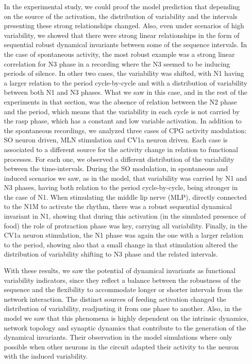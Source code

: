 In the experimental study, we could proof the model prediction that depending on the source of the activation, the distribution of variability and the intervals presenting these strong relationships changed. Also, even under scenarios of high variability, we showed that there were strong linear relationships in the form of sequential robust dynamical invariants between some of the sequence intervals. In the case of spontaneous activity, the most robust example was a strong linear correlation for N3 phase in a recording where the N3 seemed to be inducing periods of silence. In other two cases, the variability was shifted, with N1 having a larger relation to the period cycle-by-cycle and with a distribution of variability between both N1 and N3 phases. What we saw in this case, and in the rest of the experiments in that section, was the absence of relation between the N2 phase and the period, which means that the variability in each cycle is not carried by the rasp phase, which has a constant and low variable activation. In addition to the spontaneous recordings, we analyzed three cases of CPG activity modulation: SO neuron driven, MLN stimulation and CV1a neuron driven. Each case is associated to a different source for the activity change in relation to functional processes. For each one, we observed a different distribution of the variability between the time-intervals. During the SO modulation, in spontaneous and induced scenarios we saw, as in the model, that variability was carried by N1 and N3 phases, having both relation to the period cycle-by-cycle, being stronger in the case of N1. When stimulating the middle lip nerve (MLP), directly connected to the N1M to activate the rhythm, there was a robust sequential dynamical invariant in N1, showing that during this activation (in the simulated presence of food) the role of protraction phase was key, carrying all variability. Finally, in the CV1a neuron stimulation, the N1 phase was again the one with a larger relation to the period, showing also that a small change in that stimulation altered the distribution of variability shifting to N3 phase and the related intervals. 

With these results, we saw the potential of dynamical invariants as functional variability indicators, since they reflect a balance between the robustness of the sequence and the flexibility to accommodate longer or shorter intervals from the network interaction. The distinct sources of feeding activation changed the distribution of variability, readjusting it from one phase to another. Also, in the model we saw that this phenomena is highly dependent on the intrinsic dynamics, network topology and synaptic dynamics that contribute to the generation of the dynamical invariants. Their observation in the model simulations where only possible when other neurons in the circuit adapted their activity to the neuron with the induced variability. 

